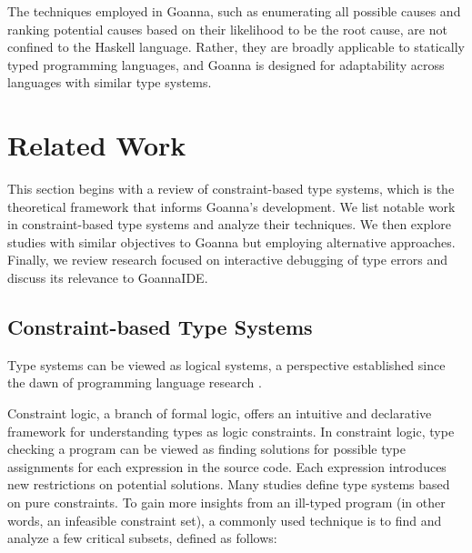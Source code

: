 \documentclass[pdflatex,lineno,sn-nature,Numbered]{sn-jnl}%
\begin{document}
The techniques employed in Goanna, such as enumerating all possible causes and ranking potential causes based on their likelihood to be the root cause, are not confined to the Haskell language. Rather, they are broadly applicable to statically typed programming languages, and Goanna is designed for adaptability across languages with similar type systems.

\section{Related Work} 
    \label{sec:related-work}
This section begins with a review of constraint-based type systems, which is the theoretical framework that informs Goanna's development. We list notable work in constraint-based type systems and analyze their techniques. We then explore studies with similar objectives to Goanna but employing alternative approaches. 
Finally, we review research focused on interactive debugging of type errors and discuss its relevance to GoannaIDE.

\subsection{Constraint-based Type Systems}
Type systems can be viewed as logical systems, a perspective established since the dawn of programming language research \cite{Reis_undated-lt}. 

Constraint logic, a branch of formal logic, offers an intuitive and declarative framework for understanding types as logic constraints. In constraint logic, type checking a program can be viewed as finding solutions for possible type assignments for each expression in the source code. Each expression introduces new restrictions on potential solutions. Many studies \cite{PottierUnknown-je, Hage2006-gc} define type systems based on pure constraints. To gain more insights from an ill-typed program (in other words, an infeasible constraint set), a commonly used technique is to find and analyze a few critical subsets, defined as follows:

\end{document}
